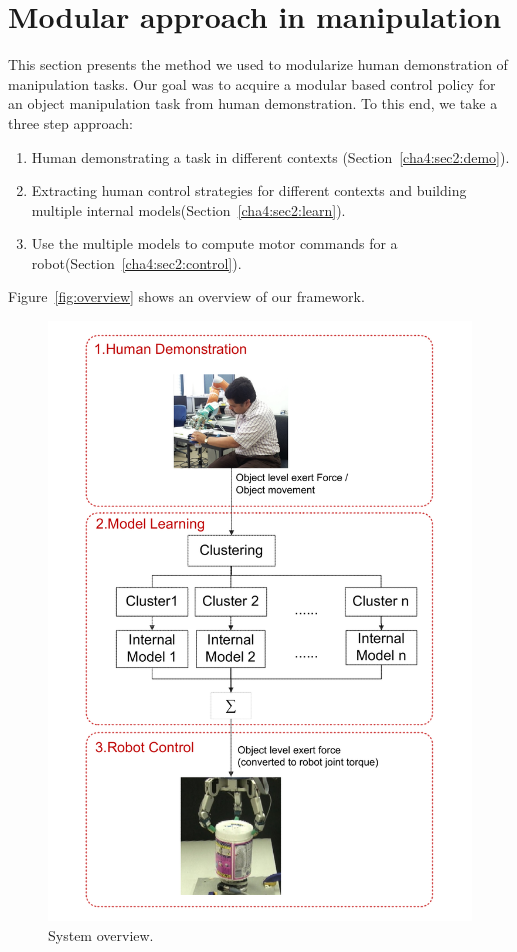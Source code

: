 \section{Modular approach in manipulation}
\label{cha4:sec2}


This section presents the method we used to modularize human demonstration of manipulation tasks. Our goal was to acquire a modular based control policy for an object manipulation task from human demonstration. To this end, we take a three step approach:
\begin{enumerate}
\item Human demonstrating a task in different contexts (Section~\ref{cha4:sec2:demo}).
\item Extracting human control strategies for different contexts and building multiple internal models(Section~\ref{cha4:sec2:learn}).
\item Use the multiple models to compute motor commands for a robot(Section~\ref{cha4:sec2:control}).
\end{enumerate}

Figure~\ref{fig:overview} shows an overview of our framework.

\begin{figure}
  \centering
   \includegraphics[width=15cm]{./fig_cha4/overview3.pdf}
  \caption{ \scriptsize{System overview.}
  \label{fig:overview}
}
\label{fig:demo}
\end{figure}

